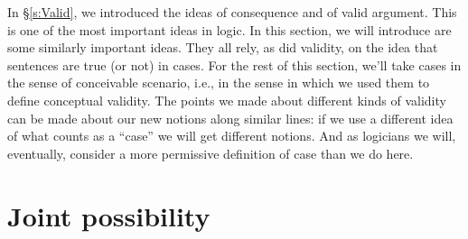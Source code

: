 In \S\ref{s:Valid}, we introduced the ideas of consequence and of valid argument.  This is one of the most important ideas in logic. In this section, we will introduce are some similarly important ideas. They all rely, as did validity, on the idea that sentences are true (or not) in cases. For the rest of this section, we'll take cases in the sense of conceivable scenario, i.e., in the sense in which we used them to define conceptual validity. The points we made about different kinds of validity can be made about our new notions along similar lines: if we use a different idea of what counts as a ``case'' we will get different notions.  And as logicians we will, eventually, consider a more permissive definition of case than we do here.



\section{Joint possibility}

